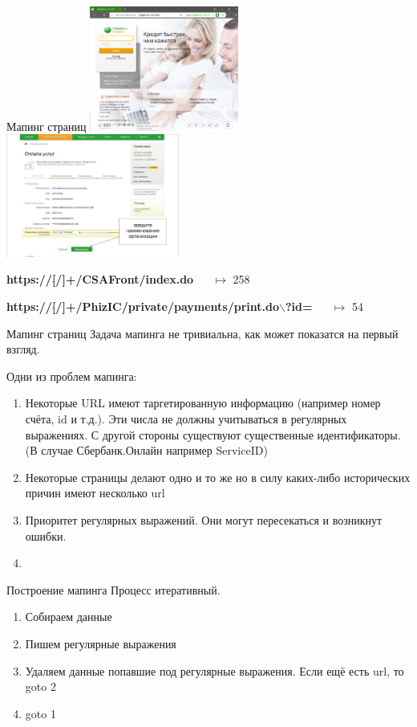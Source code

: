 \begin{frame}{Мапинг страниц}
	\includegraphics[width=4.9cm]{../pic/sber_logo_1.png}
	\includegraphics[width=5.7cm]{../pic/sber_logo_2.png}
	
	\textbf{https://[$\hat{}$/]+/CSAFront/index.do} ~~ $\longmapsto$ 258
	
	\textbf{https://[$\hat{}$/]+/PhizIC/private/payments/print.do$\backslash$?id=} ~~ $\longmapsto$ 54
\end{frame}

\begin{frame}{Мапинг страниц}
	Задача мапинга не тривиальна, как может показатся на первый взгляд.
	
	Одни из проблем мапинга:
	\begin{enumerate}
		\item Некоторые URL имеют таргетированную информацию (например номер счёта, id и т.д.).
		Эти числа не должны учитываться в регулярных выражениях.
		С другой стороны существуют существенные идентификаторы. 
		(В случае Сбербанк.Онлайн например ServiceID)
		\item Некоторые страницы делают одно и то же но в силу каких-либо исторических причин 
		имеют несколько url
		\item Приоритет регулярных выражений. Они могут пересекаться и возникнут ошибки.
		\item {}
	\end{enumerate}
\end{frame}

\begin{frame}{Построение мапинга}
	Процесс итеративный.
	\begin{enumerate}
		\item Собираем данные
		\item Пишем регулярные выражения
		\item Удаляем данные попавшие под регулярные выражения. Если ещё есть url, то goto 2
		\item goto 1
	\end{enumerate}
\end{frame}

